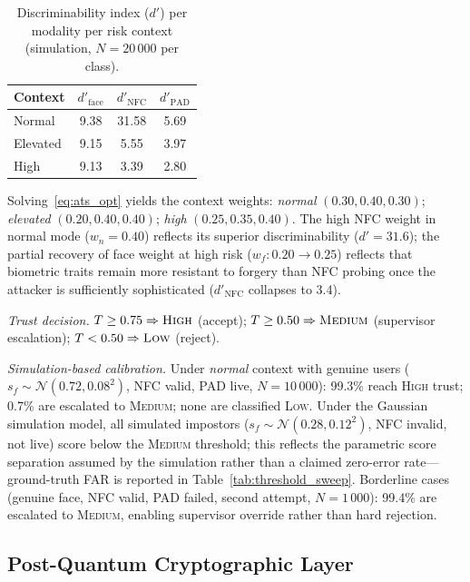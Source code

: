 \documentclass[pdflatex,sn-vancouver-num]{sn-jnl}%
\theoremstyle{thmstyleone}%
\theoremstyle{thmstyletwo}%
\theoremstyle{thmstylethree}%
\begin{document}
\begin{table}[ht]
\caption{Discriminability index (\(d'\)) per modality per risk context
  (simulation, \(N{=}20\,000\) per class).}
\label{tab:dprime}%
\begin{tabular}{|l|c|c|c|}
\hline
Context & \(d'_{\mathrm{face}}\) & \(d'_{\mathrm{NFC}}\) & \(d'_{\mathrm{PAD}}\) \\
\hline
Normal   & 9.38 & 31.58 & 5.69 \\
Elevated & 9.15 &  5.55 & 3.97 \\
High     & 9.13 &  3.39 & 2.80 \\
\hline
\end{tabular}
\end{table}

Solving~\eqref{eq:ats_opt} yields the context weights: \textit{normal}
\((0.30, 0.40, 0.30)\); \textit{elevated} \((0.20, 0.40, 0.40)\);
\textit{high} \((0.25, 0.35, 0.40)\). The high NFC weight in normal mode
(\(w_n{=}0.40\)) reflects its superior discriminability (\(d'{=}31.6\)); the
partial recovery of face weight at high risk (\(w_f: 0.20\!\to\!0.25\))
reflects that biometric traits remain more resistant to forgery than NFC
probing once the attacker is sufficiently sophisticated
(\(d'_{\mathrm{NFC}}\) collapses to 3.4).

\textit{Trust decision.} \(T \geq 0.75\Rightarrow\textsc{High}\) (accept);
\(T \geq 0.50\Rightarrow\textsc{Medium}\) (supervisor escalation);
\(T < 0.50\Rightarrow\textsc{Low}\) (reject).

\textit{Simulation-based calibration.} Under \textit{normal} context with
genuine users (\(s_f \sim \mathcal{N}(0.72,0.08^2)\), NFC valid, PAD live,
\(N{=}10\,000\)): 99.3\% reach \textsc{High} trust; 0.7\% are escalated to
\textsc{Medium}; none are classified \textsc{Low}. Under the Gaussian
simulation model, all simulated impostors (\(s_f \sim
\mathcal{N}(0.28,0.12^2)\), NFC invalid, not live) score below the
\textsc{Medium} threshold; this reflects the parametric score separation
assumed by the simulation rather than a claimed zero-error rate---ground-truth
FAR is reported in Table~\ref{tab:threshold_sweep}. Borderline cases (genuine
face, NFC valid, PAD failed, second attempt, \(N{=}1\,000\)): 99.4\% are
escalated to \textsc{Medium}, enabling supervisor override rather than hard
rejection.

\subsection{Post-Quantum Cryptographic Layer}\label{sec:pqc}
\end{document}
